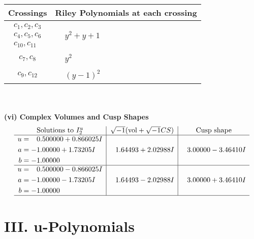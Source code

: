 \documentclass[1p]{elsarticle_modified}
\theoremstyle{definition}
\newcommand{\I}{\sqrt{-1}}
\begin{document}
\begin{tabular}{m{50pt}|m{274pt}}
Crossings & \hspace{64pt}Riley Polynomials at each crossing \\
\hline $$\begin{aligned}c_{1},c_{2},c_{3}\\c_{4},c_{5},c_{6}\\c_{10},c_{11}\end{aligned}$$&$\begin{aligned}
&y^2+y+1
\end{aligned}$\\
\hline $$\begin{aligned}c_{7},c_{8}\end{aligned}$$&$\begin{aligned}
&y^2
\end{aligned}$\\
\hline $$\begin{aligned}c_{9},c_{12}\end{aligned}$$&$\begin{aligned}
&(y-1)^2
\end{aligned}$\\
\hline
\end{tabular}\\~\\
\newpage\flushleft \textbf{(vi) Complex Volumes and Cusp Shapes}
$$\begin{array}{c|c|c}  
\text{Solutions to }I^u_{2}& \I (\text{vol} + \sqrt{-1}CS) & \text{Cusp shape}\\
 \hline 
\begin{aligned}
u &= \phantom{-}0.500000 + 0.866025 I \\
a &= -1.00000 + 1.73205 I \\
b &= -1.00000\phantom{ +0.000000I}\end{aligned}
 & \phantom{-}1.64493 + 2.02988 I & \phantom{-}3.00000 - 3.46410 I \\ \hline\begin{aligned}
u &= \phantom{-}0.500000 - 0.866025 I \\
a &= -1.00000 - 1.73205 I \\
b &= -1.00000\phantom{ +0.000000I}\end{aligned}
 & \phantom{-}1.64493 - 2.02988 I & \phantom{-}3.00000 + 3.46410 I\\
 \hline 
 \end{array}$$\newpage
\newpage\renewcommand{\arraystretch}{1}
\centering \section*{ III. u-Polynomials}
\end{document}
